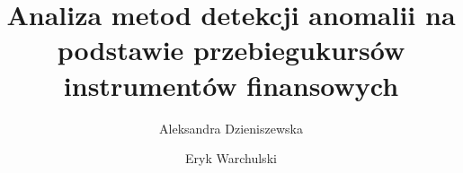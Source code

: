 
\title{Analiza metod detekcji anomalii na podstawie przebiegukursów instrumentów finansowych}
\author{Aleksandra Dzieniszewska \and Eryk Warchulski}
\date{}


\maketitle
\begin{abstract}
\end{abstract}










